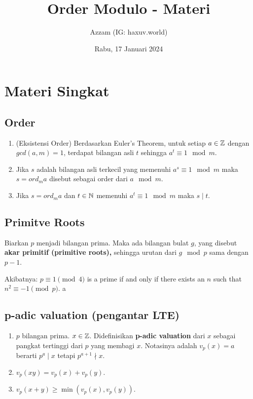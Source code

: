\documentclass[11pt]{scrartcl}
\title{Order Modulo - Materi}
\author{Azzam (IG: haxuv.world)}
\date{Rabu, 17 Januari 2024}
\begin{document}
\maketitle

\section{Materi Singkat}
\subsection{Order}
\begin{enumerate}
    \item (Eksistensi Order) Berdasarkan Euler's Theorem, untuk setiap $a \in \mathbb Z$ dengan $gcd(a,m)=1$, terdapat bilangan asli $t$ sehingga $a^t \equiv 1 \mod m$.
    \item Jika $s$ adalah bilangan asli terkecil yang memenuhi $a^s \equiv 1 \mod m$ maka $s = ord_m a$ disebut sebagai order dari $a \mod m$.
    \item Jika $s = ord_m a$ dan $t \in \mathbb N$ memenuhi $a^t \equiv 1 \mod m$ maka $s \mid t$.
\end{enumerate}

\subsection{Primitve Roots}
Biarkan $p$ menjadi bilangan prima. Maka ada bilangan bulat $g$, yang disebut \textbf{akar primitif (primitive roots),} sehingga urutan dari $g \mod p$ sama dengan $p - 1$.

Akibatnya:
$p \equiv 1 \pmod{4}$ is a prime if and only if there exists an $n$ such that $n^2 \equiv -1 \pmod{p}$.
a
\subsection{p-adic valuation (pengantar LTE)}
\begin{enumerate}
    \item $p$ bilangan prima. $x \in \mathbb Z$. Didefinisikan \textbf{p-adic valuation} dari $x$ sebagai pangkat tertinggi dari $p$ yang membagi $x$. Notasinya adalah $v_p(x)=a$ berarti $p^a \mid x$ tetapi $p^{a+1} \nmid x$.
    \item $v_p(xy) = v_p(x) + v_p(y)$.
    \item $v_p(x+y) \ge \min(v_p(x),v_p(y))$.
\end{enumerate}
\end{document}
